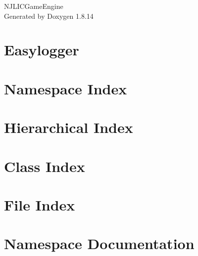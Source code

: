 \documentclass[twoside]{book}
\newcommand{\+}{\discretionary{\mbox{\scriptsize$\hookleftarrow$}}{}{}}
\newcommand{\clearemptydoublepage}{%
  \newpage{\pagestyle{empty}\cleardoublepage}%
}
\begin{document}
\hypersetup{pageanchor=false,
             bookmarksnumbered=true,
             pdfencoding=unicode
            }
\begin{titlepage}
\vspace*{7cm}
\begin{center}%
{\Large N\+J\+L\+I\+C\+Game\+Engine }\\
\vspace*{1cm}
{\large Generated by Doxygen 1.8.14}\\
\end{center}
\end{titlepage}
\clearemptydoublepage
{}
\tableofcontents
\clearemptydoublepage
{}
\hypersetup{pageanchor=true}

\chapter{Easylogger}
\label{index}\hypertarget{index}{}
\chapter{Namespace Index}

\chapter{Hierarchical Index}

\chapter{Class Index}

\chapter{File Index}

\chapter{Namespace Documentation}




\end{document}
